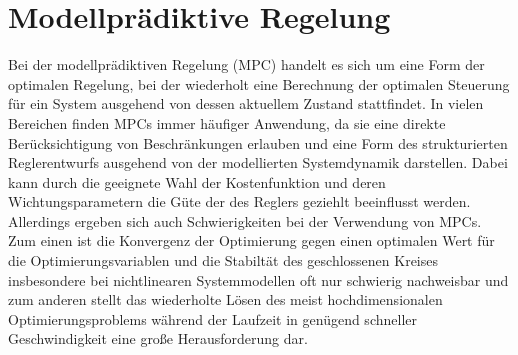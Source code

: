 \section{Modellprädiktive Regelung}
Bei der modellprädiktiven Regelung (MPC) handelt es sich um eine Form der optimalen Regelung, bei der wiederholt eine Berechnung der optimalen Steuerung für ein System ausgehend von dessen aktuellem Zustand stattfindet. In vielen Bereichen finden MPCs immer häufiger Anwendung, da sie eine direkte Berücksichtigung von Beschränkungen erlauben und eine Form des strukturierten Reglerentwurfs ausgehend von der modellierten Systemdynamik darstellen. Dabei kann durch die geeignete Wahl der Kostenfunktion und deren Wichtungsparametern die Güte der des Reglers geziehlt beeinflusst werden. Allerdings ergeben sich auch Schwierigkeiten bei der Verwendung von MPCs. Zum einen ist die Konvergenz der Optimierung gegen einen optimalen Wert für die Optimierungsvariablen und die Stabiltät des geschlossenen Kreises insbesondere bei nichtlinearen Systemmodellen oft nur schwierig nachweisbar und zum anderen stellt das wiederholte Lösen des meist hochdimensionalen Optimierungsproblems während der Laufzeit in genügend schneller Geschwindigkeit eine große Herausforderung dar.
\\
